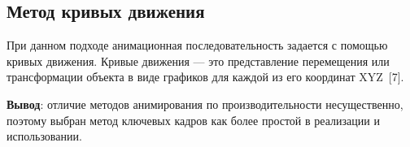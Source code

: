 	
	\subsection*{Метод кривых движения}
	
	При данном подходе анимационная последовательность задается с помощью кривых движения. Кривые движения --- это представление перемещения или трансформации объекта в виде графиков для каждой из его координат XYZ~[7].
	
	
	\textbf{Вывод}: отличие методов анимирования по производительности несущественно, поэтому выбран метод ключевых кадров как более простой в реализации и использовании.